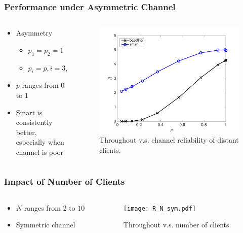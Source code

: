 \documentclass{beamer}
\begin{document}
\begin{frame}
\frametitle{Performance under Asymmetric Channel}
\begin{columns}
  \begin{column}{.5\textwidth}
\begin{itemize}
  \item Asymmetry
    \begin{itemize}
      \item $p_1=p_2=1$
      \item $p_i=p, i=3,4,\dotsc,N$
    \end{itemize}
  \item $p$ ranges from $0$ to $1$
  \item Smart is consistently better, especially when channel is poor
\end{itemize}
  \end{column}
  \begin{column}{.5\textwidth}
\begin{figure}[htbp]
  \centering
  \includegraphics[height=.5\textheight]{R_p_asym.pdf}
  \caption{Throughout v.s. channel reliability of distant clients.}
\end{figure}
  \end{column}
\end{columns}
\end{frame}

\begin{frame}
\frametitle{Impact of Number of Clients}
\begin{columns}
  \begin{column}{.5\textwidth}
\begin{itemize}
\item $N$ ranges from $2$ to $10$
\item Symmetric channel
\end{itemize}
  \end{column}
  \begin{column}{.5\textwidth}
\begin{figure}[htbp]
  \centering
  \texttt{[image: R\_N\_sym.pdf]}
  \caption{Throughout v.s. number of clients.}
\end{figure}
  \end{column}
\end{columns}
\end{frame}
\end{document}
